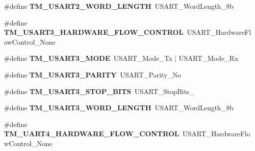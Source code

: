 \begin{DoxyCompactItemize}
\item 
\hypertarget{group___t_m___u_s_a_r_t___macros_gaf2a5db99771132e35cd743c6af22669a}{}\#define {\bfseries T\+M\+\_\+\+U\+S\+A\+R\+T2\+\_\+\+W\+O\+R\+D\+\_\+\+L\+E\+N\+G\+T\+H}~U\+S\+A\+R\+T\+\_\+\+Word\+Length\+\_\+8b\label{group___t_m___u_s_a_r_t___macros_gaf2a5db99771132e35cd743c6af22669a}

\item 
\hypertarget{group___t_m___u_s_a_r_t___macros_ga15ab9b416666fa4f28c794f9c5a8f63b}{}\#define {\bfseries T\+M\+\_\+\+U\+S\+A\+R\+T3\+\_\+\+H\+A\+R\+D\+W\+A\+R\+E\+\_\+\+F\+L\+O\+W\+\_\+\+C\+O\+N\+T\+R\+O\+L}~U\+S\+A\+R\+T\+\_\+\+Hardware\+Flow\+Control\+\_\+\+None\label{group___t_m___u_s_a_r_t___macros_ga15ab9b416666fa4f28c794f9c5a8f63b}

\item 
\hypertarget{group___t_m___u_s_a_r_t___macros_ga2c0149f9130a940b8e5efb17e25b6e6b}{}\#define {\bfseries T\+M\+\_\+\+U\+S\+A\+R\+T3\+\_\+\+M\+O\+D\+E}~U\+S\+A\+R\+T\+\_\+\+Mode\+\_\+\+Tx $\vert$ U\+S\+A\+R\+T\+\_\+\+Mode\+\_\+\+Rx\label{group___t_m___u_s_a_r_t___macros_ga2c0149f9130a940b8e5efb17e25b6e6b}

\item 
\hypertarget{group___t_m___u_s_a_r_t___macros_gae0a6bcecdf11756e240c6eaff81d15b5}{}\#define {\bfseries T\+M\+\_\+\+U\+S\+A\+R\+T3\+\_\+\+P\+A\+R\+I\+T\+Y}~U\+S\+A\+R\+T\+\_\+\+Parity\+\_\+\+No\label{group___t_m___u_s_a_r_t___macros_gae0a6bcecdf11756e240c6eaff81d15b5}

\item 
\hypertarget{group___t_m___u_s_a_r_t___macros_gab29e2d1df4ed6808ca494f9eafddd3fa}{}\#define {\bfseries T\+M\+\_\+\+U\+S\+A\+R\+T3\+\_\+\+S\+T\+O\+P\+\_\+\+B\+I\+T\+S}~U\+S\+A\+R\+T\+\_\+\+Stop\+Bits\+\_\label{group___t_m___u_s_a_r_t___macros_gab29e2d1df4ed6808ca494f9eafddd3fa}

\item 
\hypertarget{group___t_m___u_s_a_r_t___macros_ga8d838e618eed91bd82f937299ce94656}{}\#define {\bfseries T\+M\+\_\+\+U\+S\+A\+R\+T3\+\_\+\+W\+O\+R\+D\+\_\+\+L\+E\+N\+G\+T\+H}~U\+S\+A\+R\+T\+\_\+\+Word\+Length\+\_\+8b\label{group___t_m___u_s_a_r_t___macros_ga8d838e618eed91bd82f937299ce94656}

\item 
\hypertarget{group___t_m___u_s_a_r_t___macros_gab909a2a00beb7b60bfd89b03ce29ed63}{}\#define {\bfseries T\+M\+\_\+\+U\+A\+R\+T4\+\_\+\+H\+A\+R\+D\+W\+A\+R\+E\+\_\+\+F\+L\+O\+W\+\_\+\+C\+O\+N\+T\+R\+O\+L}~U\+S\+A\+R\+T\+\_\+\+Hardware\+Flow\+Control\+\_\+\+None\label{group___t_m___u_s_a_r_t___macros_gab909a2a00beb7b60bfd89b03ce29ed63}


\end{DoxyCompactItemize}

